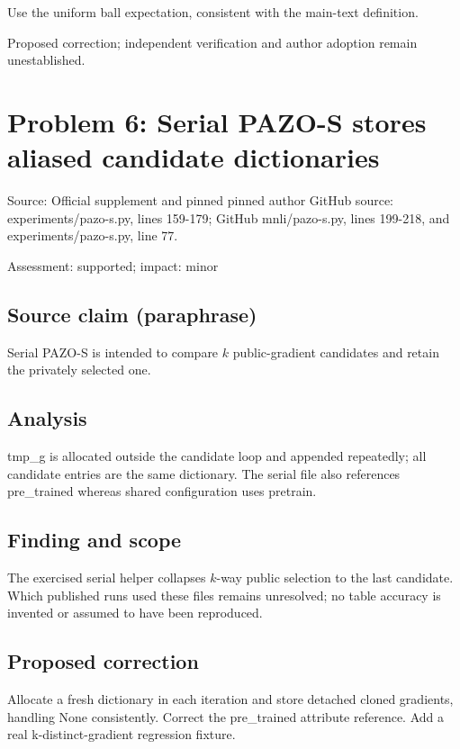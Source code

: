 \documentclass[11pt]{article}
\begin{document}
Use the uniform ball expectation, consistent with the main-text definition.

Proposed correction; independent verification and author adoption remain unestablished.

\section*{Problem 6: Serial PAZO-S stores aliased candidate dictionaries}

Source: Official supplement and pinned pinned author GitHub source: experiments/pazo-s.py, lines 159-179; GitHub mnli/pazo-s.py, lines 199-218, and experiments/pazo-s.py, line 77.

Assessment: supported; impact: minor

\subsection*{Source claim (paraphrase)}

Serial PAZO-S is intended to compare \(k\) public-gradient candidates and retain the privately selected one.

\subsection*{Analysis}

tmp\_g is allocated outside the candidate loop and appended repeatedly; all candidate entries are the same dictionary. The serial file also references pre\_trained whereas shared configuration uses pretrain.

\subsection*{Finding and scope}

The exercised serial helper collapses \(k\)-way public selection to the last candidate. Which published runs used these files remains unresolved; no table accuracy is invented or assumed to have been reproduced.

\subsection*{Proposed correction}

Allocate a fresh dictionary in each iteration and store detached cloned gradients, handling None consistently. Correct the pre\_trained attribute reference. Add a real k-distinct-gradient regression fixture.
\end{document}
